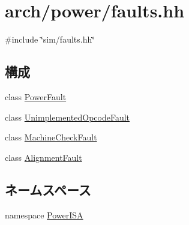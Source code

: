 \hypertarget{arch_2power_2faults_8hh}{
\section{arch/power/faults.hh}
\label{arch_2power_2faults_8hh}
}
{\ttfamily \#include \char`\"{}sim/faults.hh\char`\"{}}\par
\subsection*{構成}
\begin{DoxyCompactItemize}
\item 
class \hyperlink{classPowerISA_1_1PowerFault}{PowerFault}
\item 
class \hyperlink{classPowerISA_1_1UnimplementedOpcodeFault}{UnimplementedOpcodeFault}
\item 
class \hyperlink{classPowerISA_1_1MachineCheckFault}{MachineCheckFault}
\item 
class \hyperlink{classPowerISA_1_1AlignmentFault}{AlignmentFault}
\end{DoxyCompactItemize}
\subsection*{ネームスペース}
\begin{DoxyCompactItemize}
\item 
namespace \hyperlink{namespacePowerISA}{PowerISA}
\end{DoxyCompactItemize}
